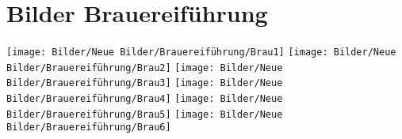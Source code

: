 \section{Bilder Brauereiführung }

\begin{figurehere}
		\texttt{[image: Bilder/Neue Bilder/Brauereiführung/Brau1]}
		\vspace{5mm}
		\hspace{3mm}  %
			\texttt{[image: Bilder/Neue Bilder/Brauereiführung/Brau2]}
		\texttt{[image: Bilder/Neue Bilder/Brauereiführung/Brau3]}
		\vspace{5mm}
		\hspace{3mm}
		    \texttt{[image: Bilder/Neue Bilder/Brauereiführung/Brau4]}
		    \texttt{[image: Bilder/Neue Bilder/Brauereiführung/Brau5]}
		    \vspace{5mm}
		    \hspace{3mm}
		    \texttt{[image: Bilder/Neue Bilder/Brauereiführung/Brau6]}

	\end{figurehere}

